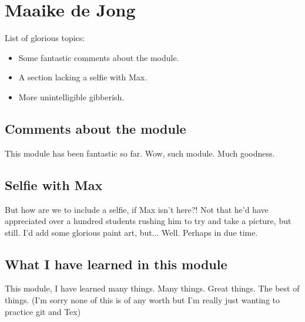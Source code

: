 \section{Maaike de Jong}

List of glorious topics:
\begin{itemize}
	\item Some fantastic comments about the module.
	\item A section lacking a selfie with Max.
	\item More unintelligible gibberish.
\end{itemize}

\subsection{Comments about the module}
This module has been fantastic so far. Wow, such module. Much goodness. 


\subsection{Selfie with Max}

But how are we to include a selfie, if Max isn't here?! Not that he'd have appreciated over a hundred students rushing him to try and take a picture, but still.
I'd add some glorious paint art, but... Well. Perhaps in due time.




\subsection{What I have learned in this module}
This module, I have learned many things. Many things. Great things. The best of things.
(I'm sorry none of this is of any worth but I'm really just wanting to practice git and Tex)